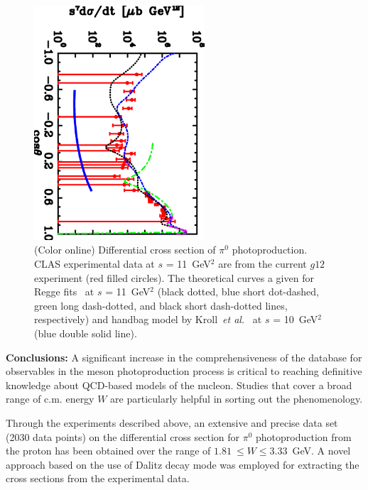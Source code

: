 \documentclass[aps,prc,onecolumn,floatfix,showpacs,preprintnumbers,amsmath,amssymb,superscriptaddress]{revtex4-1}
\begin{document}
\begin{figure}[htb!]
\centerline{
        \includegraphics[width=2.5in, angle=90]{kroll.eps}}

        \caption {(Color online) Differential cross section 
		of $\pi^0$ photoproduction. CLAS experimental 
		data at $s$ = 11~GeV$^2$ are from the 
		current $g12$ experiment (red filled circles).  
		The theoretical curves a given for Regge 
		fits~\protect\cite{Goldstein,Laget,Mathieu,
                Donnachie} at $s$ = 11~GeV$^2$ (black dotted, 
		blue short dot-dashed, green long dash-dotted, 
		and black short dash-dotted lines, 
		respectively) and handbag model by 
		Kroll~\protect\textit{et 
		al.}~\protect\cite{Kroll} at $s$ = 10~GeV$^2$ 
		(blue double solid line).} 
		\label{fig:kroll}
\end{figure}

\textbf{Conclusions:} A significant increase in the 
comprehensiveness of the database for observables in the meson 
photoproduction process is critical to reaching definitive 
knowledge about QCD-based models of the nucleon. Studies that 
cover a broad range of c.m. energy $W$ are particularly 
helpful in sorting out the phenomenology.

Through the experiments described above, an extensive and
precise data set (2030 data points) on the differential cross
section for $\pi^0$ photoproduction from the proton has been
obtained over the range of $1.81~\leq W\leq 3.33$~GeV. A novel 
approach based on the use of Dalitz decay mode was employed 
for extracting the cross sections from the experimental data.
\end{document}
